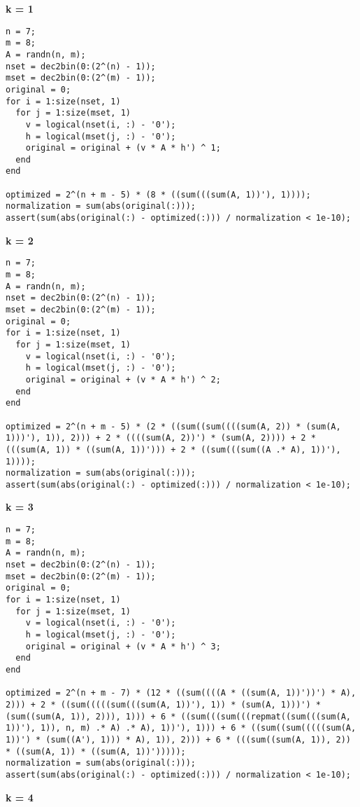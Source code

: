 {\bf k = 1}

\begin{lstlisting}
n = 7;
m = 8;
A = randn(n, m);
nset = dec2bin(0:(2^(n) - 1));
mset = dec2bin(0:(2^(m) - 1));
original = 0;
for i = 1:size(nset, 1)
  for j = 1:size(mset, 1)
    v = logical(nset(i, :) - '0');
    h = logical(mset(j, :) - '0');
    original = original + (v * A * h') ^ 1;
  end
end

optimized = 2^(n + m - 5) * (8 * ((sum(((sum(A, 1))'), 1))));
normalization = sum(abs(original(:)));
assert(sum(abs(original(:) - optimized(:))) / normalization < 1e-10);
\end{lstlisting}


{\bf k = 2}

\begin{lstlisting}
n = 7;
m = 8;
A = randn(n, m);
nset = dec2bin(0:(2^(n) - 1));
mset = dec2bin(0:(2^(m) - 1));
original = 0;
for i = 1:size(nset, 1)
  for j = 1:size(mset, 1)
    v = logical(nset(i, :) - '0');
    h = logical(mset(j, :) - '0');
    original = original + (v * A * h') ^ 2;
  end
end

optimized = 2^(n + m - 5) * (2 * ((sum((sum((((sum(A, 2)) * (sum(A, 1)))'), 1)), 2))) + 2 * ((((sum(A, 2))') * (sum(A, 2)))) + 2 * (((sum(A, 1)) * ((sum(A, 1))'))) + 2 * ((sum(((sum((A .* A), 1))'), 1))));
normalization = sum(abs(original(:)));
assert(sum(abs(original(:) - optimized(:))) / normalization < 1e-10);
\end{lstlisting}


{\bf k = 3}

\begin{lstlisting}
n = 7;
m = 8;
A = randn(n, m);
nset = dec2bin(0:(2^(n) - 1));
mset = dec2bin(0:(2^(m) - 1));
original = 0;
for i = 1:size(nset, 1)
  for j = 1:size(mset, 1)
    v = logical(nset(i, :) - '0');
    h = logical(mset(j, :) - '0');
    original = original + (v * A * h') ^ 3;
  end
end

optimized = 2^(n + m - 7) * (12 * ((sum((((A * ((sum(A, 1))'))') * A), 2))) + 2 * ((sum(((((sum(((sum(A, 1))'), 1)) * (sum(A, 1)))') * (sum((sum(A, 1)), 2))), 1))) + 6 * ((sum(((sum(((repmat((sum(((sum(A, 1))'), 1)), n, m) .* A) .* A), 1))'), 1))) + 6 * ((sum((sum(((((sum(A, 1))') * (sum((A'), 1))) * A), 1)), 2))) + 6 * (((sum((sum(A, 1)), 2)) * ((sum(A, 1)) * ((sum(A, 1))')))));
normalization = sum(abs(original(:)));
assert(sum(abs(original(:) - optimized(:))) / normalization < 1e-10);
\end{lstlisting}


{\bf k = 4}

